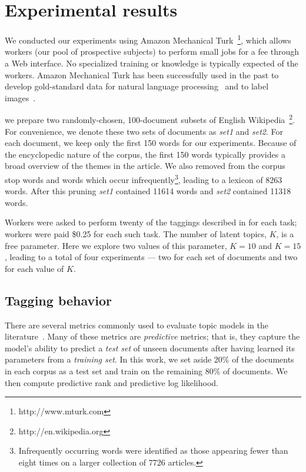 \section{Experimental results}
\label{sec:experiments}

We conducted our experiments using Amazon Mechanical
Turk~\footnote{http://www.mturk.com}, which allows workers (our pool
of prospective subjects) to perform small jobs for a fee through a Web
interface.  No specialized training or knowledge is typically expected
of the workers.  Amazon Mechanical Turk has been successfully used in
the past to develop gold-standard data for natural language
processing~\cite{snow-08} and to label images~\cite{imagenet-cvpr09}.

we prepare two randomly-chosen, 100-document subsets of English
Wikipedia~\footnote{http://en.wikipedia.org}.  For convenience, we
denote these two sets of documents as \emph{set1} and \emph{set2}.
For each document, we keep only the first 150 words for our
experiments.  Because of the encyclopedic nature of the corpus, the
first 150 words typically provides a broad overview of the themes in
the article.  We also removed from the corpus stop words and words
which occur infrequently\footnote{Infrequently occurring words were
  identified as those appearing fewer than eight times on a larger
  collection of 7726 articles.}, leading to a lexicon of 8263 words.
After this pruning \emph{set1} contained 11614 words and \emph{set2}
contained 11318 words.

Workers were asked to perform twenty of the taggings described in
 for each task; workers were paid \$0.25 for each
such task.  The number of latent topics, $K$, is a free parameter.
Here we explore two values of this parameter, $K=10$ and $K=15$,
leading to a total of four experiments --- two for each set of
documents and two for each value of $K$.

\subsection{Tagging behavior}
\label{sec:evalmetrics}

There are several metrics commonly used to evaluate topic models in
the literature~\cite{wallach-09}.  Many of these metrics are
\emph{predictive} metrics; that is, they capture the model's ability
to predict a \emph{test set} of unseen documents after having learned
its parameters from a \emph{training set}.  In this work, we set aside
20\% of the documents in each corpus as a test set and train on the
remaining 80\% of documents.  We then compute predictive rank and
predictive log likelihood.

